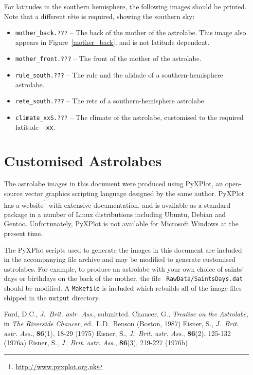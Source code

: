 \documentclass[a4paper,onecolumn,10pt]{article}
\begin{document}
For latitudes in the southern hemisphere, the following images should be
printed. Note that a different r\^ete is required, showing the southern sky:
\begin{itemize}
\item {\tt mother\_back.???} -- The back of the mother of the astrolabe. This image also appears in Figure~\ref{mother_back}, and is not latitude dependent.
\item {\tt mother\_front.???} -- The front of the mother of the astrolabe.
\item {\tt rule\_south.???} -- The rule and the alidade of a southern-hemisphere astrolabe.
\item {\tt rete\_south.???} -- The rete of a southern-hemisphere astrolabe.
\item{\tt climate\_xxS.???} -- The climate of the astrolabe, customised to the required latitude $-${\tt xx}.
\end{itemize}

\section*{Customised Astrolabes}

The astrolabe images in this document were produced using PyXPlot, an
open-source vector graphics scripting language designed by the same author.
PyXPlot has a website\footnote{\url{http://www.pyxplot.org.uk}} with extensive
documentation, and is available as a standard package in a number of Linux
distributions including Ubuntu, Debian and Gentoo. Unfortunately, PyXPlot is
not available for Microsoft Windows at the present time.

The PyXPlot scripts used to generate the images in this document are included
in the accompanying file archive and may be modified to generate customised
astrolabes. For example, to produce an astrolabe with your own choice of
saints' days or birthdays on the back of the mother, the file {\tt
RawData/SaintsDays.dat} should be modified. A {\tt Makefile} is included which
rebuilds all of the image files shipped in the {\tt output} directory.

\begin{thebibliography}{9}
Ford, D.C., \textit{J.\ Brit. astr. Ass.}, submitted.
Chaucer, G., \textit{Treatise on the Astrolabe}, in {\it The Riverside Chaucer}, ed.\ L.D.\ Benson (Boston, 1987)
Eisner, S., \textit{J.\ Brit. astr. Ass.}, \textbf{86}(1), 18-29 (1975)
Eisner, S., \textit{J.\ Brit. astr. Ass.}, \textbf{86}(2), 125-132 (1976a)
Eisner, S., \textit{J.\ Brit. astr. Ass.}, \textbf{86}(3), 219-227 (1976b)
\end{thebibliography}
\end{document}
